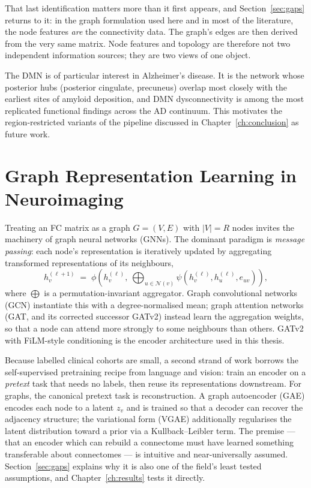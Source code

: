 That last identification matters more than it first appears, and Section~\ref{sec:gaps}
returns to it: in the graph formulation used here and in most of the literature, the node
features \emph{are} the connectivity data. The graph's edges are then derived from the very
same matrix. Node features and topology are therefore not two independent information
sources; they are two views of one object.

The DMN is of particular interest in Alzheimer's disease. It is the network whose
posterior hubs (posterior cingulate, precuneus) overlap most closely with the earliest
sites of amyloid deposition, and DMN dysconnectivity is among the most replicated
functional findings across the AD continuum. This motivates the region-restricted
variants of the pipeline discussed in Chapter~\ref{ch:conclusion} as future work.

\section{Graph Representation Learning in Neuroimaging}
\label{sec:gnn}

Treating an FC matrix as a graph $G = (V, E)$ with $|V| = R$ nodes invites the machinery
of graph neural networks (GNNs). The dominant paradigm is \emph{message passing}: each
node's representation is iteratively updated by aggregating transformed representations of
its neighbours,
\[
  h_v^{(\ell+1)} \;=\; \phi\!\left(h_v^{(\ell)},\ \bigoplus_{u \in \mathcal{N}(v)}
    \psi\!\left(h_v^{(\ell)}, h_u^{(\ell)}, e_{uv}\right)\right),
\]
where $\bigoplus$ is a permutation-invariant aggregator. Graph convolutional networks
(GCN) instantiate this with a degree-normalised mean; graph attention networks (GAT, and
its corrected successor GATv2) instead learn the aggregation weights, so that a node can
attend more strongly to some neighbours than others. GATv2 with FiLM-style conditioning is
the encoder architecture used in this thesis.

Because labelled clinical cohorts are small, a second strand of work borrows the
self-supervised pretraining recipe from language and vision: train an encoder on a
\emph{pretext} task that needs no labels, then reuse its representations downstream. For
graphs, the canonical pretext task is reconstruction. A graph autoencoder (GAE) encodes
each node to a latent $z_v$ and is trained so that a decoder can recover the adjacency
structure; the variational form (VGAE) additionally regularises the latent distribution
toward a prior via a Kullback--Leibler term. The premise --- that an encoder which can
rebuild a connectome must have learned something transferable about connectomes --- is
intuitive and near-universally assumed. Section~\ref{sec:gaps} explains why it is also
one of the field's least tested assumptions, and Chapter~\ref{ch:results} tests it
directly.

